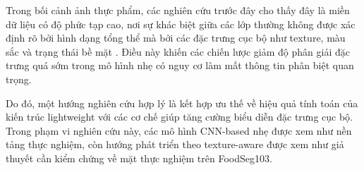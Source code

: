 Trong bối cảnh ảnh thực phẩm, các nghiên cứu trước đây cho thấy đây là miền dữ liệu có độ phức tạp cao, nơi sự khác biệt giữa các lớp thường không được xác định rõ bởi hình dạng tổng thể mà bởi các đặc trưng cục bộ như texture, màu sắc và trạng thái bề mặt \cite{zhuang2020transfer}. Điều này khiến các chiến lược giảm độ phân giải đặc trưng quá sớm trong mô hình nhẹ có nguy cơ làm mất thông tin phân biệt quan trọng.

Do đó, một hướng nghiên cứu hợp lý là kết hợp ưu thế về hiệu quả tính toán của kiến trúc lightweight với các cơ chế giúp tăng cường biểu diễn đặc trưng cục bộ. Trong phạm vi nghiên cứu này, các mô hình CNN-based nhẹ được xem như nền tảng thực nghiệm, còn hướng phát triển theo texture-aware được xem như giả thuyết cần kiểm chứng về mặt thực nghiệm trên FoodSeg103.
